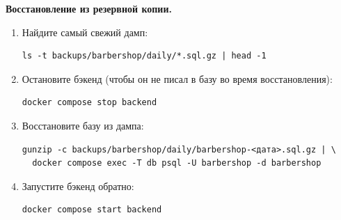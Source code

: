 \textbf{Восстановление из резервной копии.}
\begin{enumerate}
  \item Найдите самый свежий дамп:
\begin{verbatim}
ls -t backups/barbershop/daily/*.sql.gz | head -1
\end{verbatim}
  \item Остановите бэкенд (чтобы он не писал в базу во время
        восстановления):
\begin{verbatim}
docker compose stop backend
\end{verbatim}
  \item Восстановите базу из дампа:
\begin{verbatim}
gunzip -c backups/barbershop/daily/barbershop-<дата>.sql.gz | \
  docker compose exec -T db psql -U barbershop -d barbershop
\end{verbatim}
  \item Запустите бэкенд обратно:
\begin{verbatim}
docker compose start backend
\end{verbatim}
\end{enumerate}


